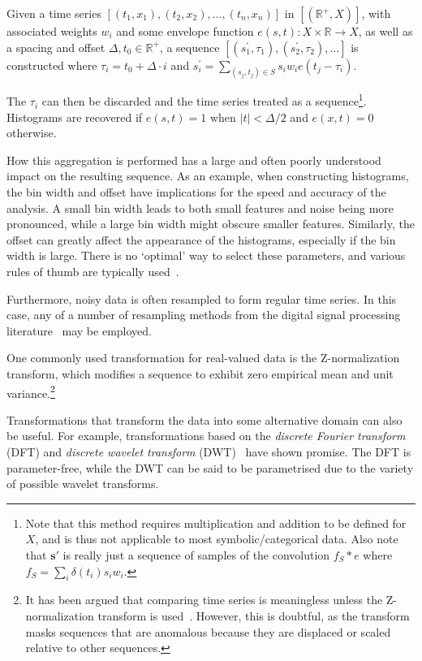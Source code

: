 Given a time series $[(t_1, x_1), (t_2, x_2), \dots, (t_n, x_n)]$ in $[(\mathbb{R}^+, X)]$, with associated weights $w_i$ and some envelope function $e(s, t): X \times \mathbb{R} \rightarrow X$, as well as a spacing and offset $\Delta, t_0 \in \mathbb{R}^+$, a sequence $[(s_{1}^{'}, \tau_1), (s_{2}^{'}, \tau_2), \dots]$ is constructed where $\tau_i = t_0 + \Delta \cdot i$ and $s_{i}^{'} = \sum_{(s_j, t_j) \in S} s_i w_i e(t_j - \tau_i)$.

The $\tau_i$ can then be discarded and the time series treated as a sequence\footnote{Note that this method requires multiplication and addition to be defined for $X$, and is thus not applicable to most symbolic/categorical data. Also note that $\mathbf{s}'$ is really just a sequence of samples of the convolution $f_S \ast e$ where $f_S = \sum_i \delta(t_i) s_i w_i$.}. Histograms are recovered if $e(s, t) = 1$ when $|t| < \Delta/2$ and $e(x, t) = 0$ otherwise. 

How this aggregation is performed has a large and often poorly understood impact on the resulting sequence. As an example, when constructing histograms, the bin width and offset have implications for the speed and accuracy of the analysis. A small bin width leads to both small features and noise being more pronounced, while a large bin width might obscure smaller features. Similarly, the offset can greatly affect the appearance of the histograms, especially if the bin width is large. There is no `optimal' way to select these parameters, and various rules of thumb are typically used~\cite{density_estimation}.

Furthermore, noisy data is often resampled to form regular time series. In this case, any of a number of resampling methods from the digital signal processing literature~\cite{TODO} may be employed.

One commonly used transformation for real-valued data is the Z-normalization transform, which modifies a sequence to exhibit zero empirical mean and unit variance.\footnote{It has been argued that comparing time series is meaningless unless the Z-normalization transform is used~\cite{keogh5}. However, this is doubtful, as the transform masks sequences that are anomalous because they are displaced or scaled relative to other sequences.}

Transformations that transform the data into some alternative domain can also be useful. For example, transformations based on the \emph{discrete Fourier transform} (DFT) and \emph{discrete wavelet transform} (DWT)~\cite{fu} have shown promise. The DFT is parameter-free, while the DWT can be said to be parametrised due to the variety of possible wavelet transforms.

